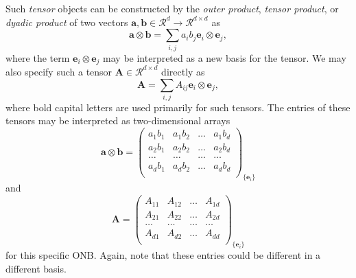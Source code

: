 Such \emph{tensor} objects can be constructed by the \emph{outer product}, \emph{tensor product}, or \emph{dyadic product} of two vectors $\mathbf{a}, \mathbf{b} \in \mathcal{R}^d \rightarrow \mathcal{R}^{d \times d}$ as 
\begin{equation}
    \label{eq:tensorproduct}
    \mathbf{a} \otimes \mathbf{b} = \sum_{i,j} a_i b_j \mathbf{e}_i \otimes \mathbf{e}_j,
\end{equation}
where the term $\mathbf{e}_i \otimes \mathbf{e}_j$ may be interpreted as a new basis for the tensor. We may also specify such a tensor $\mathbf{A} \in \mathcal{R}^{d \times d}$ directly as 
\begin{equation}
    \mathbf{A} = \sum_{i,j} A_{ij} \mathbf{e}_i \otimes \mathbf{e}_j ,
\end{equation}
where bold capital letters are used primarily for such tensors.
The entries of these tensors may be interpreted as two-dimensional arrays
\begin{equation}
    \mathbf{a} \otimes \mathbf{b} =
    \begin{pmatrix}
         a_1 b_1    & a_1 b_2   & \dots   & a_1 b_d  \\
         a_2 b_1    & a_2 b_2   & \dots   & a_2 b_d  \\
         \dots      & \dots     & \dots   & \dots  \\
         a_d b_1    & a_d b_2   & \dots   & a_d b_d  \\
    \end{pmatrix}_{\{\mathbf{e}_i\}}
\end{equation}
and 
\begin{equation}
    \mathbf{A} =
    \begin{pmatrix}
         A_{11}    & A_{12}   & \dots   & A_{1d}  \\
         A_{21}    & A_{22}   & \dots   & A_{2d}  \\
         \dots      & \dots     & \dots   & \dots  \\
         A_{d1}    & A_{d2}   & \dots   & A_{dd}  \\
    \end{pmatrix}_{\{\mathbf{e}_i\}}
\end{equation}
for this specific ONB. Again, note that these entries could be different in a different basis.


